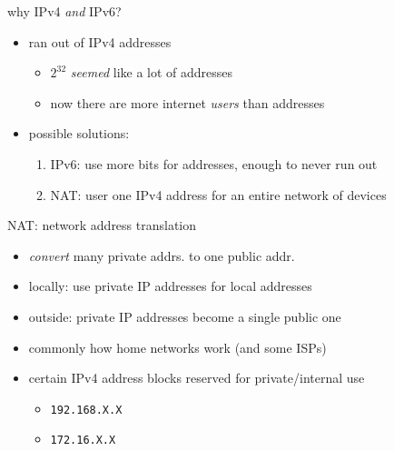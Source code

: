 

\begin{frame}{why IPv4 \textit{and} IPv6?}
\begin{itemize}
\item ran out of IPv4 addresses
    \begin{itemize}
    \item $2^{32}$ \textit{seemed} like a lot of addresses
    \item now there are more internet \textit{users} than addresses
    \end{itemize}
\item<2-> possible solutions:
    \begin{enumerate}
    \item<2-> IPv6: use more bits for addresses, enough to never run out
    \item<3-> NAT: user one IPv4 address for an entire network of devices
    \end{enumerate}
\end{itemize}
\end{frame}

\begin{frame}{NAT: network address translation}
\begin{itemize}
\item \textit{convert} many private addrs. to one public addr.
\item locally: use private IP addresses for local addresses
\item outside: private IP addresses become a single public one
\item commonly how home networks work (and some ISPs)
\item certain IPv4 address blocks reserved for private/internal use
    \begin{itemize}
    \item \texttt{192.168.X.X}
    \item \texttt{172.16.X.X}
    \end{itemize}
\end{itemize}
\end{frame}

\usetikzlibrary{arrows.meta,decorations.pathreplacing,shapes.misc}
\usetikzlibrary{arrows.meta,shapes.symbols,shapes.multipart,calc}

